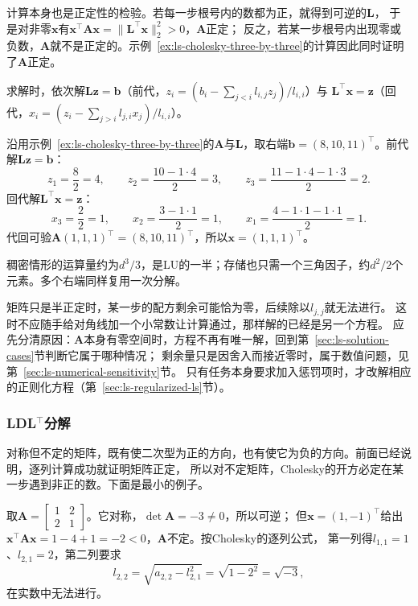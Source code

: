 计算本身也是正定性的检验。若每一步根号内的数都为正，就得到可逆的$\bm L$，
于是对非零$\bm x$有$\bm x^\top\bm A\bm x=\lVert\bm L^\top\bm x\rVert_2^2>0$，$\bm A$正定；
反之，若某一步根号内出现零或负数，$\bm A$就不是正定的。示例~\ref{ex:ls-cholesky-three-by-three}的计算因此同时证明了$\bm A$正定。

求解时，依次解$\bm L\bm z=\bm b$（前代，$z_i=(b_i-\sum_{j<i}l_{i,j}z_j)/l_{i,i}$）与
$\bm L^\top\bm x=\bm z$（回代，$x_i=(z_i-\sum_{j>i}l_{j,i}x_j)/l_{i,i}$）。

\begin{example}[用Cholesky因子求解]
\label{ex:ls-cholesky-solve}
沿用示例~\ref{ex:ls-cholesky-three-by-three}的$\bm A$与$\bm L$，取右端$\bm b=(8,10,11)^\top$。前代解$\bm L\bm z=\bm b$：
\[
 z_1=\frac82=4,\qquad z_2=\frac{10-1\cdot4}{2}=3,\qquad z_3=\frac{11-1\cdot4-1\cdot3}{2}=2.
\]
回代解$\bm L^\top\bm x=\bm z$：
\[
 x_3=\frac22=1,\qquad x_2=\frac{3-1\cdot1}{2}=1,\qquad x_1=\frac{4-1\cdot1-1\cdot1}{2}=1.
\]
代回可验$\bm A(1,1,1)^\top=(8,10,11)^\top$，所以$\bm x=(1,1,1)^\top$。
\end{example}

稠密情形的运算量约为$d^3/3$，是LU的一半；存储也只需一个三角因子，约$d^2/2$个元素。多个右端同样复用一次分解。

矩阵只是半正定时，某一步的配方剩余可能恰为零，后续除以$l_{j,j}$就无法进行。
这时不应随手给对角线加一个小常数让计算通过，那样解的已经是另一个方程。
应先分清原因：$\bm A$本身有零空间时，方程不再有唯一解，回到第~\ref{sec:ls-solution-cases}节判断它属于哪种情况；
剩余量只是因舍入而接近零时，属于数值问题，见第~\ref{sec:ls-numerical-sensitivity}节。
只有任务本身要求加入惩罚项时，才改解相应的正则化方程（第~\ref{sec:ls-regularized-ls}节）。

\subsubsection{LDL$^{\top}$分解}
\label{sec:ls-ldlt}

对称但不定的矩阵，既有使二次型为正的方向，也有使它为负的方向。前面已经说明，逐列计算成功就证明矩阵正定，
所以对不定矩阵，Cholesky的开方必定在某一步遇到非正的数。下面是最小的例子。

\begin{example}[反例：不定矩阵的Cholesky中断]
\label{ex:ls-cholesky-indefinite}
取$\bm A=\left[\begin{smallmatrix}1&2\\2&1\end{smallmatrix}\right]$。它对称，$\det\bm A=-3\neq0$，所以可逆；
但$\bm x=(1,-1)^\top$给出$\bm x^\top\bm A\bm x=1-4+1=-2<0$，$\bm A$不定。按Cholesky的逐列公式，
第一列得$l_{1,1}=1$、$l_{2,1}=2$，第二列要求
\[
 l_{2,2}=\sqrt{a_{2,2}-l_{2,1}^2}=\sqrt{1-2^2}=\sqrt{-3},
\]
在实数中无法进行。
\end{example}

